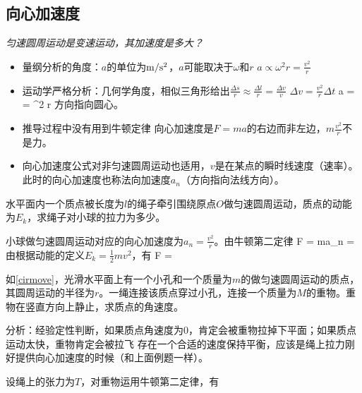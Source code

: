 \documentclass[a4paper,9pt]{ctexart}
\begin{document}
\subsection{向心加速度}
\emph{匀速圆周运动是变速运动，其加速度是多大？}
\begin{itemize}
\item
量纲分析的角度：$a$的单位为${\rm m/s^2}$，$a$可能取决于$\omega$和$r$ \so $a \propto \omega^2 r = \frac{v^2}{r}$
\item
运动学严格分析：几何学角度，相似三角形给出$\frac{\Delta s}{r} \approx \frac{\Delta l}{r} = \frac{\Delta v}{v}$ \so $\Delta v = \frac{v^2}{r} \Delta t$ \so 
\beq
a =  = \omega^2 r
\eeq
方向指向圆心。
\item
推导过程中没有用到牛顿定律 \so 向心加速度是$F=ma$的右边而非左边，$m\frac{v^2}{r}$不是力。
\item
向心加速度公式对非匀速圆周运动也适用，$v$是在某点的瞬时线速度（速率）。此时的向心加速度也称法向加速度$a_n$（方向指向法线方向）。
\end{itemize}
\begin{eg}
水平面内一个质点被长度为$l$的绳子牵引围绕原点$O$做匀速圆周运动，质点的动能为$E_k$，求绳子对小球的拉力为多少。
\end{eg}
\begin{ans}
小球做匀速圆周运动对应的向心加速度为$a_n = \frac{v^2}{r}$。由牛顿第二定律
\beq
F = ma_n = 
\eeq
由根据动能的定义$E_k = \frac{1}{2}mv^2$，有
\beq
F = 
\eeq
\end{ans}

\begin{eg}
如\cref{cirmove}，光滑水平面上有一个小孔和一个质量为$m$的做匀速圆周运动的质点，其圆周运动的半径为$r$。一绳连接该质点穿过小孔，连接一个质量为$M$的重物。重物在竖直方向上静止，求质点的角速度。
\end{eg}
\begin{ans}
分析：经验定性判断，如果质点角速度为0，肯定会被重物拉掉下平面；如果质点运动太快，重物肯定会被拉飞 \so 存在一个合适的速度保持平衡，应该是绳上拉力刚好提供向心加速度的时候（和上面例题一样）。
\par
设绳上的张力为$T$，对重物运用牛顿第二定律，有
\vspace{4cm}
\end{ans}
\end{document}
